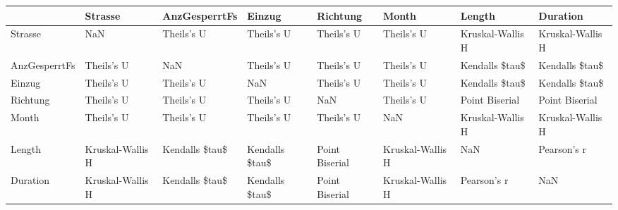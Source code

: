 \begin{tabular}{llllllll}
\toprule
{} &           Strasse &   AnzGesperrtFs &          Einzug &        Richtung &             Month &            Length &          Duration \\
\midrule
Strasse       &               NaN &      Theils's U &      Theils's U &      Theils's U &        Theils's U &  Kruskal-Wallis H &  Kruskal-Wallis H \\
AnzGesperrtFs &        Theils's U &             NaN &      Theils's U &      Theils's U &        Theils's U &    Kendalls \$tau\$ &    Kendalls \$tau\$ \\
Einzug        &        Theils's U &      Theils's U &             NaN &      Theils's U &        Theils's U &    Kendalls \$tau\$ &    Kendalls \$tau\$ \\
Richtung      &        Theils's U &      Theils's U &      Theils's U &             NaN &        Theils's U &    Point Biserial &    Point Biserial \\
Month         &        Theils's U &      Theils's U &      Theils's U &      Theils's U &               NaN &  Kruskal-Wallis H &  Kruskal-Wallis H \\
Length        &  Kruskal-Wallis H &  Kendalls \$tau\$ &  Kendalls \$tau\$ &  Point Biserial &  Kruskal-Wallis H &               NaN &       Pearson's r \\
Duration      &  Kruskal-Wallis H &  Kendalls \$tau\$ &  Kendalls \$tau\$ &  Point Biserial &  Kruskal-Wallis H &       Pearson's r &               NaN \\
\bottomrule
\end{tabular}
